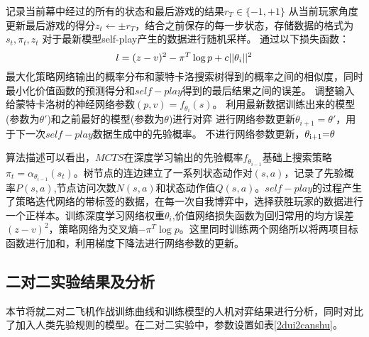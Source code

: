 		\begin{algorithm}[htbp]
		\begin{algorithmic}[1]
		\State 记录当前幕中经过的所有的状态和最后游戏的结果${r_T} \in \{  - 1, + 1\} $
		\State 从当前玩家角度更新最后游戏的得分${z_t} \leftarrow  \pm {r_T}$，结合之前保存的每一步状态，存储数据的格式为$s_t,\pi_t,z_t$
		\EndFor
		\State 对于最新模型self-play产生的数据进行随机采样。
		\State 通过以下损失函数：
		\begin{equation}
		l = {(z - v)^2} - {\pi ^T}\log p + c||{\theta _i}{\rm{|}}{{\rm{|}}^{\rm{2}}}
		\end{equation}
		最大化策略网络输出的概率分布和蒙特卡洛搜索树得到的概率之间的相似度，同时最小化价值函数的预测得分和$self-play$得到的最后结果之间的误差。
		调整输入给蒙特卡洛树的神经网络参数$(p,v) = {f_{{\theta _i}}}(s)$。
		\State 利用最新数据训练出来的模型(参数为$\theta '$)和之前最好的模型(参数为$\theta$)进行对弈
		 \State 进行网络参数更新${\theta _{i + 1}} = \theta '$，用于下一次$self-play$数据生成中的先验概率。
		\Else
		 \State 不进行网络参数更新，${\theta _{{\rm{i + 1}}}}{\rm{ = }}\theta $
		\EndIf
		\EndIf
		\EndFor
	\end{algorithmic}
\end{algorithm}

算法描述可以看出，$MCTS$在深度学习输出的先验概率${f_{{\theta _{i - 1}}}}$基础上搜索策略${\pi _t} = {\alpha _{{\theta _{i - 1}}}}({s_t})$。树节点的连边建立了一系列状态动作对$(s,a)$，记录了先验概率$P(s,a)$,节点访问次数$N(s,a)$和状态动作值$Q(s,a)$。$self-play$的过程产生了策略迭代网络的带标签的数据，在每一次自我博弈中，选择获胜玩家的数据进行一个正样本。训练深度学习网络权重${\theta _i}$,价值网络损失函数为回归常用的均方误差${(z - v)^2}$，策略网络为交叉熵$ - {\pi ^T}\log p$。这里同时训练两个网络所以将两项目标函数进行加和，利用梯度下降法进行网络参数的更新。

\subsection{二对二实验结果及分析}
本节将就二对二飞机作战训练曲线和训练模型的人机对弈结果进行分析，同时对比了加入人类先验规则的模型。在二对二实验中，参数设置如表\ref{2dui2canshu}。

